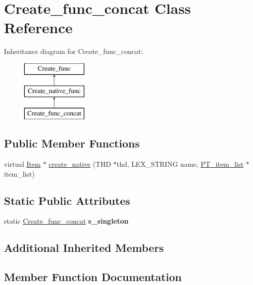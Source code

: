 \hypertarget{classCreate__func__concat}{}\section{Create\+\_\+func\+\_\+concat Class Reference}
\label{classCreate__func__concat}
Inheritance diagram for Create\+\_\+func\+\_\+concat\+:\begin{figure}[H]
\begin{center}
\leavevmode
\includegraphics[height=3.000000cm]{classCreate__func__concat}
\end{center}
\end{figure}
\subsection*{Public Member Functions}
\begin{DoxyCompactItemize}
\item 
virtual \mbox{\hyperlink{classItem}{Item}} $\ast$ \mbox{\hyperlink{classCreate__func__concat_aa4eb53f1b8f4e77ebfd67598c18b67ce}{create\+\_\+native}} (T\+HD $\ast$thd, L\+E\+X\+\_\+\+S\+T\+R\+I\+NG name, \mbox{\hyperlink{classPT__item__list}{P\+T\+\_\+item\+\_\+list}} $\ast$item\+\_\+list)
\end{DoxyCompactItemize}
\subsection*{Static Public Attributes}
\begin{DoxyCompactItemize}
\item 
\mbox{\label{classCreate__func__concat_a457f8ab7a3dc122e0f374458d032fc9c}} 
static \mbox{\hyperlink{classCreate__func__concat}{Create\+\_\+func\+\_\+concat}} {\bfseries s\+\_\+singleton}
\end{DoxyCompactItemize}
\subsection*{Additional Inherited Members}


\subsection{Member Function Documentation}
\mbox{\label{classCreate__func__concat_aa4eb53f1b8f4e77ebfd67598c18b67ce}} 

